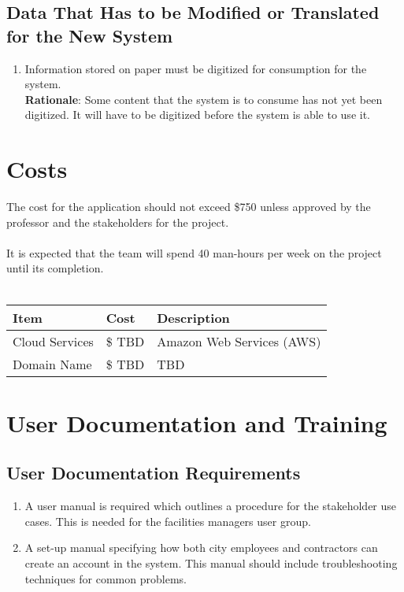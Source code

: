 \documentclass[12pt]{article}
\begin{document}
\subsection{Data That Has to be Modified or Translated for the New System}
\begin{enumerate} [{MI-TR}1.]
  \item Information stored on paper must be digitized for consumption for the
    system.\\
    \textbf{Rationale}: Some content that the system is to consume has not yet
    been digitized. It will have to be digitized before the system is able to
    use it.
\end{enumerate}

\section{Costs}
The cost for the application should not exceed \$750 unless approved by the professor and
the stakeholders for the project.\\
\\
It is expected that the team will spend 40 man-hours per week on the project until its completion.\\
\\
\begin{tabularx}{\textwidth}{p{3cm}p{2cm}X}
  \toprule {\textbf{Item}} & {\textbf{Cost}} & {\textbf{Description}}\\
  \midrule
  Cloud Services   & \$ TBD     & Amazon Web Services (AWS) \\ 
  Domain Name      & \$ TBD     & TBD           \\ 
  \bottomrule
  \end{tabularx}
 

\section{User Documentation and Training}
\subsection{User Documentation Requirements}
\begin{enumerate} [{UDT-DR}1.]
\item A user manual is required which outlines a procedure for the stakeholder
use cases. This is needed for the facilities managers user group.
\item A set-up manual specifying how both city employees and contractors
can create an account in the system. This manual should include
troubleshooting techniques for common problems. 
\end{enumerate}
\end{document}
